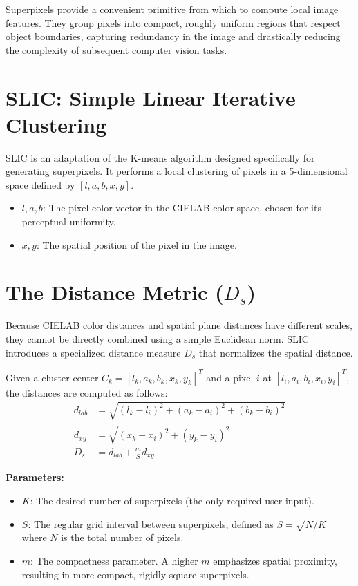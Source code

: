 \documentclass{report}
\begin{document}
Superpixels provide a convenient primitive from which to compute local image features. They group pixels into compact, roughly uniform regions that respect object boundaries, capturing redundancy in the image and drastically reducing the complexity of subsequent computer vision tasks.

\section{SLIC: Simple Linear Iterative Clustering}
SLIC is an adaptation of the K-means algorithm designed specifically for generating superpixels. It performs a local clustering of pixels in a 5-dimensional space defined by $[l, a, b, x, y]$.
\begin{itemize}
    \item $l, a, b$: The pixel color vector in the CIELAB color space, chosen for its perceptual uniformity.
    \item $x, y$: The spatial position of the pixel in the image.
\end{itemize}

\section{The Distance Metric ($D_s$)}
Because CIELAB color distances and spatial plane distances have different scales, they cannot be directly combined using a simple Euclidean norm. SLIC introduces a specialized distance measure $D_s$ that normalizes the spatial distance.

Given a cluster center $C_k = [l_k, a_k, b_k, x_k, y_k]^T$ and a pixel $i$ at $[l_i, a_i, b_i, x_i, y_i]^T$, the distances are computed as follows:
\begin{align}
    d_{lab} & = \sqrt{(l_k - l_i)^2 + (a_k - a_i)^2 + (b_k - b_i)^2} \\
    d_{xy}  & = \sqrt{(x_k - x_i)^2 + (y_k - y_i)^2}                 \\
    D_s     & = d_{lab} + \frac{m}{S} d_{xy}
\end{align}

\textbf{Parameters:}
\begin{itemize}
    \item $K$: The desired number of superpixels (the only required user input).
    \item $S$: The regular grid interval between superpixels, defined as $S = \sqrt{N/K}$ where $N$ is the total number of pixels.
    \item $m$: The compactness parameter. A higher $m$ emphasizes spatial proximity, resulting in more compact, rigidly square superpixels.
\end{itemize}
\end{document}
